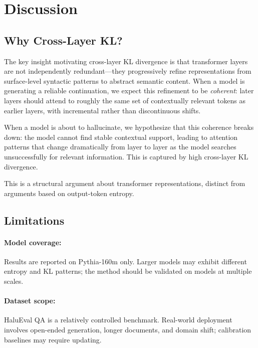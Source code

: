 \documentclass[11pt]{article}
\begin{document}
\section{Discussion}

\subsection{Why Cross-Layer KL?}

The key insight motivating cross-layer KL divergence is that transformer 
layers are not independently redundant—they progressively refine representations 
from surface-level syntactic patterns to abstract semantic content.
When a model is generating a reliable continuation, we expect this refinement 
to be \emph{coherent}: later layers should attend to roughly the same set of 
contextually relevant tokens as earlier layers, with incremental rather than 
discontinuous shifts.

When a model is about to hallucinate, we hypothesize that this coherence breaks 
down: the model cannot find stable contextual support, leading to attention 
patterns that change dramatically from layer to layer as the model searches 
unsuccessfully for relevant information.
This is captured by high cross-layer KL divergence.

This is a structural argument about transformer representations, distinct 
from arguments based on output-token entropy.

\subsection{Limitations}

\paragraph{Model coverage:} 
Results are reported on Pythia-160m only. 
Larger models may exhibit different entropy and KL patterns; 
the method should be validated on models at multiple scales.

\paragraph{Dataset scope:}
HaluEval QA is a relatively controlled benchmark. 
Real-world deployment involves open-ended generation, longer documents, 
and domain shift; calibration baselines may require updating.
\end{document}
